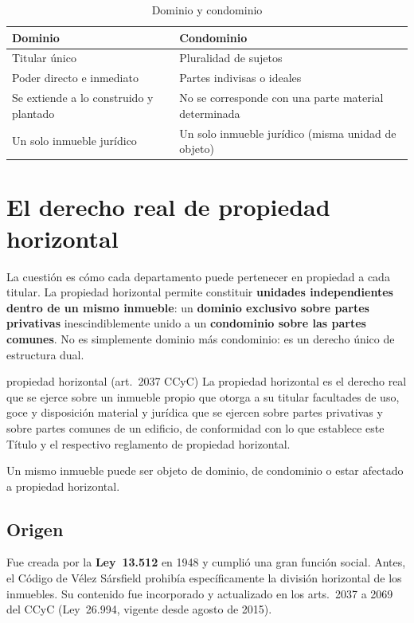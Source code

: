 \documentclass[12pt,oneside]{book}
\begin{document}
\begin{table}[H]
\centering
\small
\begin{tabularx}{\textwidth}{>{\raggedright\arraybackslash}X>{\raggedright\arraybackslash}X}
\toprule
\textbf{Dominio} & \textbf{Condominio} \\
\midrule
Titular único & Pluralidad de sujetos \\
Poder directo e inmediato & Partes indivisas o ideales \\
Se extiende a lo construido y plantado & No se corresponde con una parte material determinada \\
Un solo inmueble jurídico & Un solo inmueble jurídico (misma unidad de objeto) \\
\bottomrule
\end{tabularx}
\caption{Dominio y condominio}
\end{table}

\section{El derecho real de propiedad horizontal}

La cuestión es cómo cada departamento puede pertenecer en propiedad a cada titular. La propiedad horizontal permite constituir \textbf{unidades independientes dentro de un mismo inmueble}: un \textbf{dominio exclusivo sobre partes privativas} inescindiblemente unido a un \textbf{condominio sobre las partes comunes}. No es simplemente dominio más condominio: es un derecho único de estructura dual.

\begin{definicion}{propiedad horizontal (art.~2037 CCyC)}
La propiedad horizontal es el derecho real que se ejerce sobre un inmueble propio que otorga a su titular facultades de uso, goce y disposición material y jurídica que se ejercen sobre partes privativas y sobre partes comunes de un edificio, de conformidad con lo que establece este Título y el respectivo reglamento de propiedad horizontal.
\end{definicion}

Un mismo inmueble puede ser objeto de dominio, de condominio o estar afectado a propiedad horizontal.

\subsection{Origen}

Fue creada por la \textbf{Ley~13.512} en 1948 y cumplió una gran función social. Antes, el Código de Vélez Sársfield prohibía específicamente la división horizontal de los inmuebles. Su contenido fue incorporado y actualizado en los arts.~2037 a 2069 del CCyC (Ley~26.994, vigente desde agosto de 2015).
\end{document}
